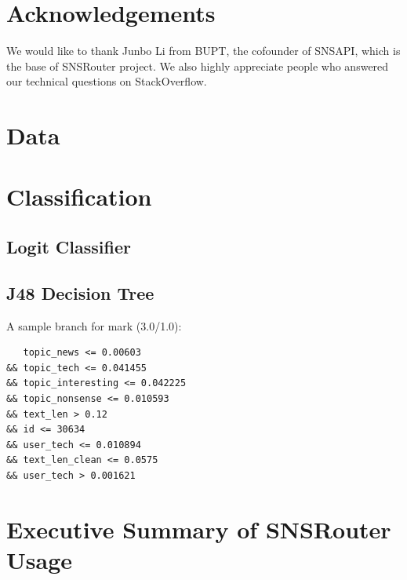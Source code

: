 \documentclass{sig-alternate}
\begin{document}
\section*{Acknowledgements}
\label{sec:Acknowledgements}

We would like to thank Junbo Li from BUPT, 
the cofounder of SNSAPI, 
which is the base of SNSRouter project. 
We also highly appreciate people who answered our 
technical questions on StackOverflow. 




\appendix 

\section{Data}
\label{sec:Data}

\section{Classification}
\label{sec:app_Classification}

\subsection{Logit Classifier}
\label{sec:Logit Classifier}

\subsection{J48 Decision Tree}
\label{sec:J48 Decision Tree}

A sample branch for mark (3.0/1.0):

\begin{Verbatim}
   topic_news <= 0.00603 
&& topic_tech <= 0.041455
&& topic_interesting <= 0.042225 
&& topic_nonsense <= 0.010593 
&& text_len > 0.12 
&& id <= 30634 
&& user_tech <= 0.010894 
&& text_len_clean <= 0.0575
&& user_tech > 0.001621
\end{Verbatim}

\section{Executive Summary of SNSRouter Usage}
\label{sec:Executive Summary of SNSRouter Usage}




\end{document}
